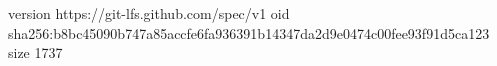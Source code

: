 version https://git-lfs.github.com/spec/v1
oid sha256:b8bc45090b747a85accfe6fa936391b14347da2d9e0474c00fee93f91d5ca123
size 1737
